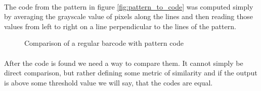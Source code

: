\paragraph{}
The code from the pattern in figure \ref{fig:pattern_to_code} was computed simply by averaging the grayscale value of pixels along the lines and then reading those values from left to right on a line perpendicular to the lines of the pattern.

\begin{figure}[H]
     \centering
     \hfill
     \caption{Comparison of a regular barcode with pattern code}
     \label{fig:regular_vs_pattern_code}
\end{figure}
\paragraph{}
After the code is found we need a way to compare them. It cannot simply be direct comparison, but rather defining some metric of similarity and if the output is above some threshold value we will say, that the codes are equal.